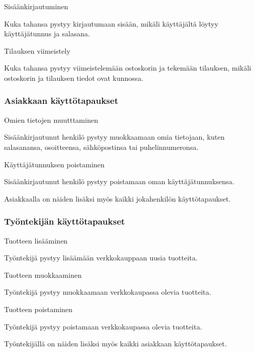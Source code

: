 \documentclass[a4paper,12pt, titlepage]{article}
\begin{document}
\noindent
Sisäänkirjautuminen
\begin{adjustwidth}{2.5em}{0pt}
Kuka tahansa pystyy kirjautumaan sisään, mikäli käyttäjältä löytyy käyttäjätunnus ja salasana.
\end{adjustwidth}
\hfill

\noindent
Tilauksen viimeistely
\begin{adjustwidth}{2.5em}{0pt}
Kuka tahansa pystyy viimeistelemään ostoskorin ja tekemään tilauksen, mikäli ostoskorin ja tilauksen tiedot ovat kunnossa.
\end{adjustwidth}

\subsubsection*{Asiakkaan käyttötapaukset}
Omien tietojen muutttaminen
\begin{adjustwidth}{2.5em}{0pt}
Sisäänkirjautunut henkilö pystyy muokkaamaan omia tietojaan, kuten salasanansa, osoitteensa, sähköpostinsa tai puhelinnumeronsa. 
\end{adjustwidth}
\hfill

\noindent
Käyttäjätunnuksen poistaminen
\begin{adjustwidth}{2.5em}{0pt}
Sisäänkirjautunut henkilö pystyy poistamaan oman käyttäjätunnuksensa.
\end{adjustwidth}
\hfill

\noindent
Asiakkaalla on näiden lisäksi myös kaikki jokahenkilön käyttötapaukset.

\subsubsection*{Työntekijän käyttötapaukset}
Tuotteen lisääminen
\begin{adjustwidth}{2.5em}{0pt}
Työntekijä pystyy lisäämään verkkokauppaan uusia tuotteita.
\end{adjustwidth}
\hfill

\noindent
Tuotteen muokkaaminen
\begin{adjustwidth}{2.5em}{0pt}
Työntekijä pystyy muokkaamaan verkkokaupassa olevia tuotteita.
\end{adjustwidth}
\hfill

\noindent
Tuotteen poistaminen
\begin{adjustwidth}{2.5em}{0pt}
Työntekijä pystyy poistamaan verkkokaupassa olevia tuotteita.
\end{adjustwidth}
\hfill

\noindent
Työntekijällä on näiden lisäksi myös kaikki asiakkaan käyttötapaukset.
\end{document}
